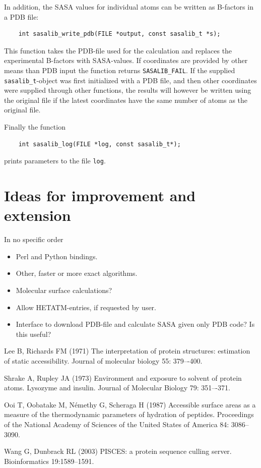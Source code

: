 \documentclass[a4paper,11pt]{article}
\begin{document}
In addition, the SASA values for individual atoms can be written as
B-factors in a PDB file:
\begin{verbatim}
    int sasalib_write_pdb(FILE *output, const sasalib_t *s);
\end{verbatim}
This function takes the PDB-file used for the calculation and replaces
the experimental B-factors with SASA-values. If coordinates are
provided by other means than PDB input the function returns
\verb|SASALIB_FAIL|. If the supplied \verb|sasalib_t|-object was first
initialized with a PDB file, and then other coordinates were supplied
through other functions, the results will however be written using the
original file if the latest coordinates have the same number of atoms
as the original file.

Finally the function
\begin{verbatim}
    int sasalib_log(FILE *log, const sasalib_t*);
\end{verbatim}
prints parameters to the file \verb|log|.

\section{Ideas for improvement and extension}

In no specific order
\begin{itemize}
\item Perl and Python bindings.
\item Other, faster or more exact algorithms.
\item Molecular surface calculations?
\item Allow HETATM-entries, if requested by user.
\item Interface to download PDB-file and calculate SASA given only PDB
  code? Is this useful?
\end{itemize}

\begin{thebibliography}{50}

  Lee B, Richards FM (1971) The interpretation of protein
  structures: estimation of static accessibility. Journal of molecular
  biology 55: 379–-400.

  Shrake A, Rupley JA (1973) Environment and exposure to
  solvent of protein atoms. Lysozyme and insulin. Journal of Molecular
  Biology 79: 351–-371.

  Ooi T, Oobatake M, Némethy G, Scheraga H (1987)
  Accessible surface areas as a measure of the thermodynamic
  parameters of hydration of peptides. Proceedings of the National
  Academy of Sciences of the United States of America 84: 3086–3090.

  Wang G, Dunbrack RL (2003) PISCES: a protein sequence culling server. 
  Bioinformatics 19:1589--1591.

\end{thebibliography}
\end{document}
